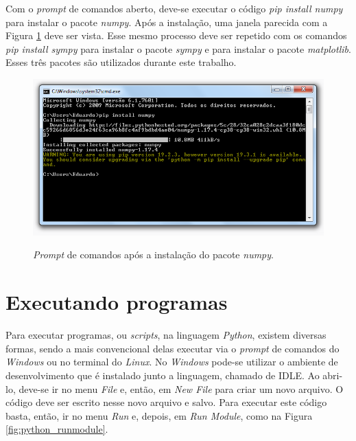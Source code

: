 \documentclass[
	12pt,				%
	openright,			%
    twoside,			%
	a4paper,			%
	chapter=TITLE,		%
	english,			%
	french,				%
	spanish,			%
	brazil				%
	]{abntex2}
\numberwithin{lema}{chapter}
\numberwithin{teorema}{chapter}
\numberwithin{definicao}{chapter}
\numberwithin{exemplo}{chapter}
\numberwithin{figure}{chapter}
\begin{document}
\begin{apendicesenv}
{	Com o \textit{prompt} de comandos aberto, deve-se executar o código \textit{pip install numpy} para instalar o pacote \textit{numpy}. Após a instalação, uma janela parecida com a Figura \ref{fig:python_pip_numpy} deve ser vista. Esse mesmo processo deve ser repetido com os comandos \textit{pip install sympy} para instalar o pacote \textit{sympy} e  para instalar o pacote \textit{matplotlib}. Esses três pacotes são utilizados durante este trabalho.
	
	\begin{figure}[h]
		\caption{\textit{Prompt} de comandos após a instalação do pacote \textit{numpy}.}
		\centering
		\includegraphics[scale=0.6]{../figuras/python/python_pip_numpy.png}
		\label{fig:python_pip_numpy}
	\end{figure}
	
	\section{Executando programas}
	
	Para executar programas, ou \textit{scripts}, na linguagem \textit{Python}, existem diversas formas, sendo a mais convencional delas executar via o \textit{prompt} de comandos do \textit{Windows} ou no terminal do \textit{Linux}. No \textit{Windows} pode-se utilizar o ambiente de desenvolvimento que é instalado junto a linguagem, chamado de IDLE. Ao abri-lo, deve-se ir no menu \textit{File} e, então, em \textit{New File} para criar um novo arquivo. O código deve ser escrito nesse novo arquivo e salvo. Para executar este código basta, então, ir no menu \textit{Run} e, depois, em \textit{Run Module}, como na Figura \ref{fig:python_runmodule}.
	
}
\end{apendicesenv}
\end{document}
